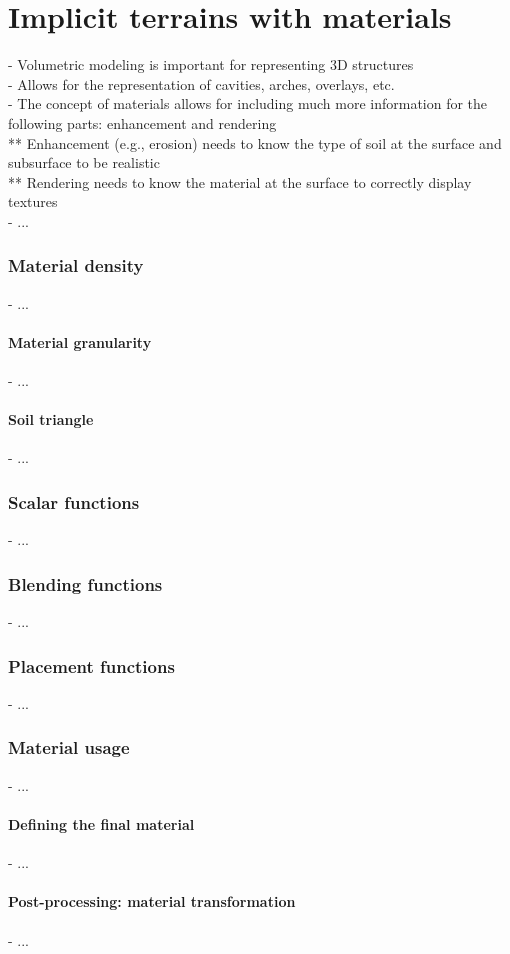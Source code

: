 
\chapter{Implicit terrains with materials}
\label{sec:state-of-the-art_implicit-terrain-with-materials}
- Volumetric modeling is important for representing 3D structures \\
- Allows for the representation of cavities, arches, overlays, etc. \\
- The concept of materials allows for including much more information for the following parts: enhancement and rendering \\
** Enhancement (e.g., erosion) needs to know the type of soil at the surface and subsurface to be realistic \\
** Rendering needs to know the material at the surface to correctly display textures \\
- ...

\subsection{Material density}
- ...

\subsubsection{Material granularity}
- ...

\subsubsection{Soil triangle}
- ...

\subsection{Scalar functions}
- ...

\subsection{Blending functions}
- ...

\subsection{Placement functions}
- ...

\subsection{Material usage}
- ...

\subsubsection{Defining the final material}
- ...

\subsubsection{Post-processing: material transformation}
- ...
